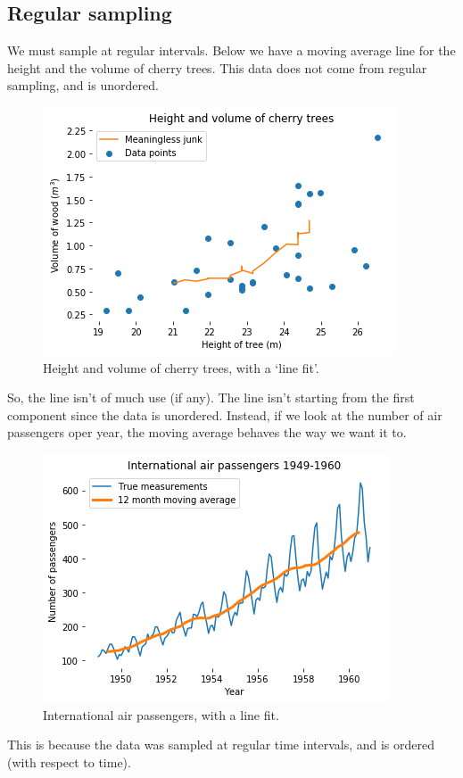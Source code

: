 \documentclass[a4paper, openany]{memoir}
\begin{document}
\subsection{Regular sampling}
We must sample at regular intervals. Below we have a moving average line for the height and the volume of cherry trees. This data does not come from regular sampling, and is unordered.
\begin{figure}[H]
    \centering
    \includegraphics[scale=0.55]{src/6.3 height and volume of cherry trees.png}
    \caption{Height and volume of cherry trees, with a `line fit'.}
\end{figure}
\noindent So, the line isn't of much use (if any). The line isn't starting from the first component since the data is unordered. Instead, if we look at the number of air passengers oper year, the moving average behaves the way we want it to.
\begin{figure}[H]
    \centering
    \includegraphics[scale=0.55]{src/6.4 international air passengers.png}
    \caption{International air passengers, with a line fit.}
\end{figure}
\noindent This is because the data was sampled at regular time intervals, and is ordered (with respect to time). 
\end{document}
